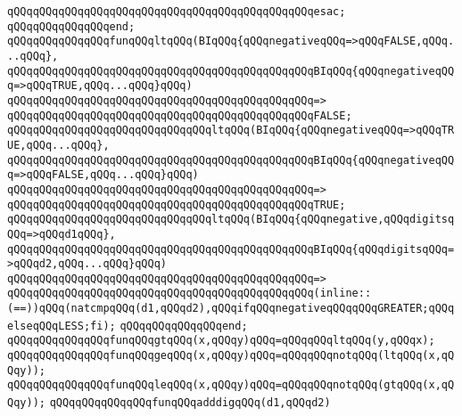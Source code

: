 \verb|qQQqqQQqqQQqqQQqqQQqqQQqqQQqqQQqqQQqqQQqqQQqqQQqesac;|\newline
\verb|qQQqqQQqqQQqqQQqend;|\newline
\newline
\verb|qQQqqQQqqQQqqQQqfunqQQqltqQQq(BIqQQq{qQQqnegativeqQQq=>qQQqFALSE,qQQq...qQQq},|\newline
\verb|qQQqqQQqqQQqqQQqqQQqqQQqqQQqqQQqqQQqqQQqqQQqqQQqBIqQQq{qQQqnegativeqQQq=>qQQqTRUE,qQQq...qQQq}qQQq)|\newline
\verb|qQQqqQQqqQQqqQQqqQQqqQQqqQQqqQQqqQQqqQQqqQQqqQQq=>|\newline
\verb|qQQqqQQqqQQqqQQqqQQqqQQqqQQqqQQqqQQqqQQqqQQqqQQqFALSE;|\newline
\newline
\verb|qQQqqQQqqQQqqQQqqQQqqQQqqQQqqQQqltqQQq(BIqQQq{qQQqnegativeqQQq=>qQQqTRUE,qQQq...qQQq},|\newline
\verb|qQQqqQQqqQQqqQQqqQQqqQQqqQQqqQQqqQQqqQQqqQQqqQQqBIqQQq{qQQqnegativeqQQq=>qQQqFALSE,qQQq...qQQq}qQQq)|\newline
\verb|qQQqqQQqqQQqqQQqqQQqqQQqqQQqqQQqqQQqqQQqqQQqqQQq=>|\newline
\verb|qQQqqQQqqQQqqQQqqQQqqQQqqQQqqQQqqQQqqQQqqQQqqQQqTRUE;|\newline
\newline
\verb|qQQqqQQqqQQqqQQqqQQqqQQqqQQqqQQqltqQQq(BIqQQq{qQQqnegative,qQQqdigitsqQQq=>qQQqd1qQQq},|\newline
\verb|qQQqqQQqqQQqqQQqqQQqqQQqqQQqqQQqqQQqqQQqqQQqqQQqBIqQQq{qQQqdigitsqQQq=>qQQqd2,qQQq...qQQq}qQQq)|\newline
\verb|qQQqqQQqqQQqqQQqqQQqqQQqqQQqqQQqqQQqqQQqqQQqqQQq=>|\newline
\verb|qQQqqQQqqQQqqQQqqQQqqQQqqQQqqQQqqQQqqQQqqQQqqQQq(inline::(==))qQQq(natcmpqQQq(d1,qQQqd2),qQQqifqQQqnegativeqQQqqQQqGREATER;qQQqelseqQQqLESS;fi);|\newline
\verb|qQQqqQQqqQQqqQQqend;|\newline
\newline
\verb|qQQqqQQqqQQqqQQqfunqQQqgtqQQq(x,qQQqy)qQQq=qQQqqQQqltqQQq(y,qQQqx);|\newline
\verb|qQQqqQQqqQQqqQQqfunqQQqgeqQQq(x,qQQqy)qQQq=qQQqqQQqnotqQQq(ltqQQq(x,qQQqy));|\newline
\verb|qQQqqQQqqQQqqQQqfunqQQqleqQQq(x,qQQqy)qQQq=qQQqqQQqnotqQQq(gtqQQq(x,qQQqy));|\newline
\newline
\verb|qQQqqQQqqQQqqQQqfunqQQqadddigqQQq(d1,qQQqd2)|\newline
